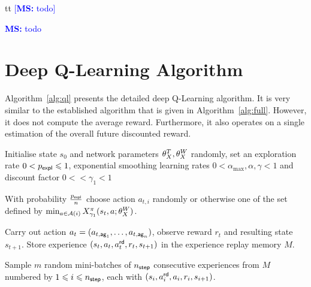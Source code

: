 \documentclass[envcountsame]{llncs}
\newcommand\MS[2][r]{\ifx t#1 \textcolor{blue}{[\textbf{MS:} #2]}
  \else \begin{center}\textcolor{blue}{\textbf{MS:} #2} \end{center} \fi}
\begin{document}
\MS[t]{todo}



\vfill
\pagebreak[4!]
\appendix

\section{Deep Q-Learning Algorithm}

Algorithm~\ref{alg:ql} presents the detailed deep Q-Learning algorithm. It is very similar to the
established \ARA{} algorithm that is given in Algorithm~\ref{alg:full}. However, it does not compute
the average reward. Furthermore, it also operates on a single estimation of the overall future
discounted reward.

\begin{algorithm}[h!]
  \begin{algorithmic}[1]
    \State{}Initialise state \(s_{0}\) and network parameters \(\theta_X^{T}, \theta_X^{W}\) randomly,
    set an exploration rate \(0 < p_{\mathsf{expl}} \leqslant 1\), exponential smoothing learning rates
    \(0 < \alpha_{\max}, \alpha, \gamma < 1\) and discount factor \(0 < < \gamma_{1} < 1\)
      \State{}%
    \begin{minipage}[t]{\dimexpr\textwidth-\leftmargin-\labelsep-\labelwidth-\leftmargin+2pt}
      With probability \(\frac{p_{\mathsf{expl}}}{n}\) choose action \(a_{t,i}\) randomly or otherwise one of
      the set defined by
      \(\min_{a \in \mathcal{A}(i)}X^{\pi}_{\gamma_{1}}(s_{t},a; \theta_X^{W}{})\).
    \end{minipage}
    \EndFor{}
    \State{}%
    \begin{minipage}[t]{\dimexpr\textwidth-\leftmargin-\labelsep-\labelwidth}
      Carry out action \(a_{t}=(a_{t,\mathsf{ag}_{1}},\ldots,a_{t,\mathsf{ag}_{n}})\), observe reward
      \(r_{t}\) and resulting state \(s_{t+1}\). Store experience
      \((s_{t}, a_{t}, a_{t}^{\mathsf{rd}}, r_{t}, s_{t+1})\) in the experience replay memory \(M\).
    \end{minipage}
    \State{}%
    \begin{minipage}[t]{\dimexpr\textwidth-\leftmargin-\labelsep-\labelwidth-\leftmargin+2pt}
      Sample \(m\) random mini-batches of \(n_{\mathsf{step}}\) consecutive experiences from \(M\) numbered by
      \(1 \leqslant i \leqslant n_{\mathsf{step}}\), each with
      \((s_{i}, a_{i}^{\mathsf{rd}}, a_{i}, r_{i}, s_{i+1})\).

\end{minipage}
\end{algorithmic}
\end{algorithm}
\end{document}
